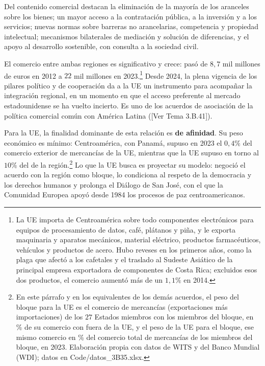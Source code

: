 \documentclass[10pt,a4paper]{article}
\newcommand{\authorfont}[1]{{\fontfamily{EBGaramond-TLF}\selectfont #1}}
\begin{document}
Del contenido comercial destacan la eliminación de la mayoría de los aranceles sobre los bienes; un mayor acceso a la contratación pública, a la inversión y a los servicios; nuevas normas sobre barreras no arancelarias, competencia y propiedad intelectual; mecanismos bilaterales de mediación y solución de diferencias, y el apoyo al desarrollo sostenible, con consulta a la sociedad civil.

El comercio entre ambas regiones es significativo y crece: pasó de $8,7$ mil millones de euros en 2012 a $22$ mil millones en 2023.\footnote{%
    La UE importa de Centroamérica sobre todo componentes electrónicos para equipos de procesamiento de datos, café, plátanos y piña, y le exporta maquinaria y aparatos mecánicos, material eléctrico, productos farmacéuticos, vehículos y productos de acero. Hubo reveses en los primeros años, como la plaga que afectó a los cafetales y el traslado al Sudeste Asiático de la principal empresa exportadora de componentes de Costa Rica; excluidos esos dos productos, el comercio aumentó más de un $1,1\%$ en 2014.
} Desde 2024, la plena vigencia de los pilares político y de cooperación da a la UE un instrumento para acompañar la integración regional, en un momento en que el acceso preferente al mercado estadounidense se ha vuelto incierto. Es uno de los acuerdos de asociación de la política comercial común con América Latina ([\authorfont{Ver Tema 3.B.41}]).

Para la UE, la finalidad dominante de esta relación es \textbf{de afinidad}. Su peso económico es mínimo: Centroamérica, con Panamá, supuso en 2023 el $0,4\%$ del comercio exterior de mercancías de la UE, mientras que la UE supuso en torno al $10\%$ del de la región.\footnote{%
    En este párrafo y en los equivalentes de los demás acuerdos, el peso del bloque para la UE es el comercio de mercancías (exportaciones más importaciones) de los $27$ Estados miembros con los miembros del bloque, en \% de su comercio con fuera de la UE, y el peso de la UE para el bloque, ese mismo comercio en \% del comercio total de mercancías de los miembros del bloque, en 2023. Elaboración propia con datos de WITS y del Banco Mundial (WDI); datos en Code/datos\_3B35.xlsx.
} Lo que la UE busca es proyectar su modelo: negoció el acuerdo con la región como bloque, lo condiciona al respeto de la democracia y los derechos humanos y prolonga el Diálogo de San José, con el que la Comunidad Europea apoyó desde 1984 los procesos de paz centroamericanos.
\end{document}
